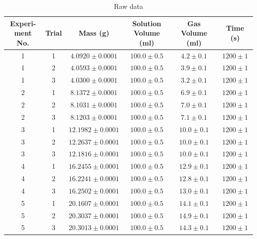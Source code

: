 \documentclass[a4paper]{article}
\begin{document}
\begin{table}[ht]
\centering
\caption{Raw data}
\begin{tabular}{cccccc}
    \hline
    \makecell{Experi-\\ ment No.} & Trial & {Mass (\si{\gram})} & \makecell{Solution\\ Volume (\si{\milli\litre})} & \makecell{Gas Volume\\ (\si{\milli\litre})} & {Time (\si{\second})} \\
    \hline
    1 & 1 & $4.0920 \pm 0.0001$  & $100.0 \pm 0.5$ &  $4.2 \pm 0.1$ & $1200 \pm 1$ \\
    1 & 2 & $4.0593 \pm 0.0001$  & $100.0 \pm 0.5$ &  $3.9 \pm 0.1$ & $1200 \pm 1$ \\
    1 & 3 & $4.0300 \pm 0.0001$  & $100.0 \pm 0.5$ &  $3.2 \pm 0.1$ & $1200 \pm 1$ \\
    2 & 1 & $8.1372 \pm 0.0001$  & $100.0 \pm 0.5$ &  $6.9 \pm 0.1$ & $1200 \pm 1$ \\
    2 & 2 & $8.1031 \pm 0.0001$  & $100.0 \pm 0.5$ &  $7.0 \pm 0.1$ & $1200 \pm 1$ \\
    2 & 3 & $8.1203 \pm 0.0001$  & $100.0 \pm 0.5$ &  $7.1 \pm 0.1$ & $1200 \pm 1$ \\
    3 & 1 & $12.1982 \pm 0.0001$ & $100.0 \pm 0.5$ & $10.0 \pm 0.1$ & $1200 \pm 1$ \\
    3 & 2 & $12.2637 \pm 0.0001$ & $100.0 \pm 0.5$ & $10.0 \pm 0.1$ & $1200 \pm 1$ \\
    3 & 3 & $12.1816 \pm 0.0001$ & $100.0 \pm 0.5$ & $10.0 \pm 0.1$ & $1200 \pm 1$ \\
    4 & 1 & $16.2455 \pm 0.0001$ & $100.0 \pm 0.5$ & $12.9 \pm 0.1$ & $1200 \pm 1$ \\
    4 & 2 & $16.2241 \pm 0.0001$ & $100.0 \pm 0.5$ & $12.8 \pm 0.1$ & $1200 \pm 1$ \\
    4 & 3 & $16.2502 \pm 0.0001$ & $100.0 \pm 0.5$ & $13.0 \pm 0.1$ & $1200 \pm 1$ \\
    5 & 1 & $20.1607 \pm 0.0001$ & $100.0 \pm 0.5$ & $14.1 \pm 0.1$ & $1200 \pm 1$ \\
    5 & 2 & $20.3037 \pm 0.0001$ & $100.0 \pm 0.5$ & $14.9 \pm 0.1$ & $1200 \pm 1$ \\
    5 & 3 & $20.3013 \pm 0.0001$ & $100.0 \pm 0.5$ & $14.3 \pm 0.1$ & $1200 \pm 1$ \\
    \hline
\end{tabular}
\end{table}
\end{document}
